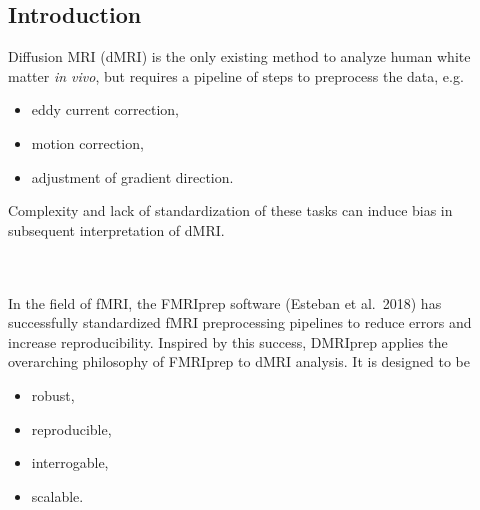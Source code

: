 \documentclass[a0, landscape]{a0poster}
\begin{document}
\vspace{0.5cm} %


\begin{multicols}{3} %


\section*{Introduction}

\noindent Diffusion MRI (dMRI) is the only existing method to analyze human white matter \emph{in vivo}, but requires a pipeline of steps to preprocess the data, e.g.
\begin{itemize}
    \item eddy current correction,
    \item motion correction,
    \item adjustment of gradient direction.
\end{itemize}
Complexity and lack of standardization of these tasks can induce bias in subsequent interpretation of dMRI.

\\  \\

\noindent In the field of fMRI, the FMRIprep software (Esteban et al.~2018) has successfully standardized fMRI preprocessing pipelines to reduce errors and increase reproducibility. Inspired by this success, DMRIprep applies the overarching philosophy of FMRIprep to dMRI analysis. It is designed to be
\begin{itemize}
    \item robust,
    \item reproducible,
    \item interrogable,
    \item scalable.
\end{itemize}



\end{multicols}
\end{document}
